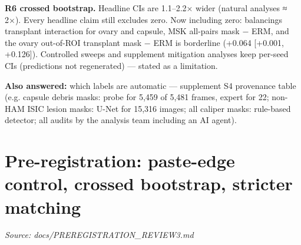 {\textbf{R6 crossed bootstrap.} Headline CIs are 1.1--2.2× wider (natural analyses ≈ 2×). Every headline claim still excludes
zero. Now including zero: balancing\textquotesingle s transplant interaction for ovary and capsule, MSK all-pairs mask − ERM, and the
ovary out-of-ROI transplant mask − ERM is borderline (+0.064 {[}+0.001, +0.126{]}). Controlled sweeps and supplement
mitigation analyses keep per-seed CIs (predictions not regenerated) --- stated as a limitation.

\textbf{Also answered:} which labels are automatic --- supplement S4 provenance table (e.g. capsule debris masks: probe for
5,459 of 5,481 frames, expert for 22; non-HAM ISIC lesion masks: U-Net for 15,316 images; all caliper masks: rule-based
detector; all audits by the analysis team including an AI agent).

}

\section{Pre-registration: paste-edge control, crossed bootstrap, stricter matching}\label{doc:PREREGISTRATION_REVIEW3}
\noindent\textit{Source: docs/PREREGISTRATION\_REVIEW3.md}

